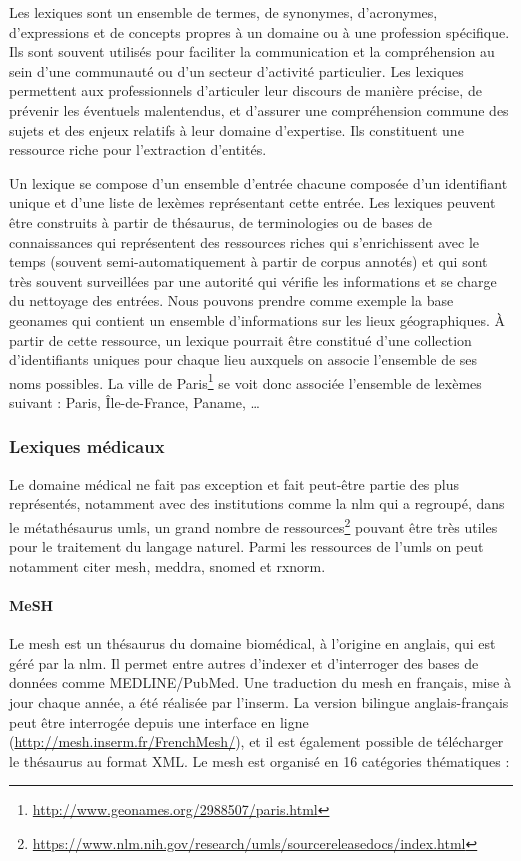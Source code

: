 Les lexiques sont un ensemble de termes, de synonymes, d'acronymes, d'expressions et de concepts propres à un domaine ou à une profession spécifique.
Ils sont souvent utilisés pour faciliter la communication et la compréhension au sein d'une communauté ou d'un secteur d'activité particulier.
Les lexiques permettent aux professionnels d'articuler leur discours de manière précise, de prévenir les éventuels malentendus, et d'assurer une compréhension commune des sujets et des enjeux relatifs à leur domaine d'expertise.
Ils constituent une ressource riche pour l'extraction d'entités.

Un lexique se compose d'un ensemble d'entrée chacune composée d'un identifiant unique et d'une liste de lexèmes représentant cette entrée.
Les lexiques peuvent être construits à partir de thésaurus, de terminologies ou de bases de connaissances qui représentent des ressources riches qui s'enrichissent avec le temps (souvent semi-automatiquement à partir de corpus annotés) et qui sont très souvent surveillées par une autorité qui vérifie les informations et se charge du nettoyage des entrées.
Nous pouvons prendre comme exemple la base \gls{geonames} qui contient un ensemble d'informations sur les lieux géographiques.
À partir de cette ressource, un lexique pourrait être constitué d'une collection d'identifiants uniques pour chaque lieu auxquels on associe l'ensemble de ses noms possibles.
La ville de Paris\footnote{\url{http://www.geonames.org/2988507/paris.html}} se voit donc associée l'ensemble de lexèmes suivant : Paris, Île-de-France, Paname, \dots

\subsubsection{Lexiques médicaux}

Le domaine médical ne fait pas exception et fait peut-être partie des plus représentés, notamment avec des institutions comme la \gls{nlm} qui a regroupé, dans le métathésaurus \gls{umls}, un grand nombre de ressources\footnote{\url{https://www.nlm.nih.gov/research/umls/sourcereleasedocs/index.html}} pouvant être très utiles pour le traitement du langage naturel.
Parmi les ressources de l'\gls{umls} on peut notamment citer \gls{mesh}, \gls{meddra}, \gls{snomed} et \gls{rxnorm}.

\paragraph{MeSH}
Le \gls{mesh} \cite{lipscombMedicalSubjectHeadings2000} est un thésaurus du domaine biomédical, à l'origine en anglais, qui est géré par la \gls{nlm}.
Il permet entre autres d'indexer et d'interroger des bases de données comme MEDLINE/PubMed.
Une traduction du \gls{mesh} en français, mise à jour chaque année, a été réalisée par l'\gls{inserm}.
La version bilingue anglais-français peut être interrogée depuis une interface en ligne (\url{http://mesh.inserm.fr/FrenchMesh/}), et il est également possible de télécharger le thésaurus au format XML.
Le \gls{mesh} est organisé en \num{16} catégories thématiques :

